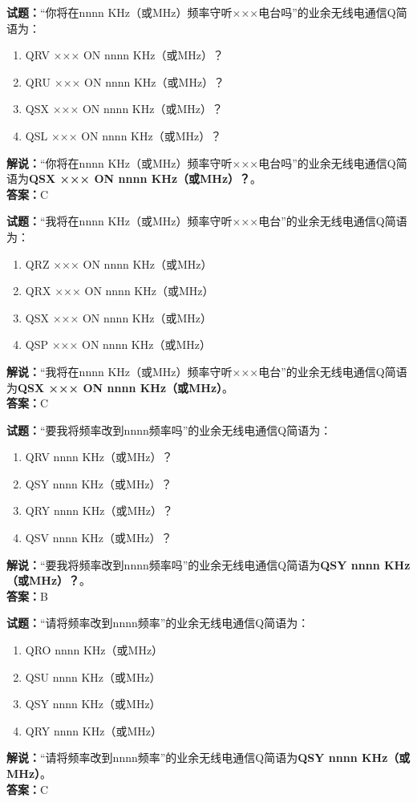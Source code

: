 \documentclass{ctexbook}
\begin{document}
\bigskip


\noindent\textbf{试题：}“你将在nnnn KHz（或MHz）频率守听×××电台吗”的业余无线电通信Q简语为：
\begin{enumerate}[leftmargin=3em]
\item QRV ××× ON nnnn KHz（或MHz）？
\item QRU ××× ON nnnn KHz（或MHz）？
\item QSX ××× ON nnnn KHz（或MHz）？
\item QSL ××× ON nnnn KHz（或MHz）？
\end{enumerate}
\noindent\textbf{解说：}“你将在nnnn KHz（或MHz）频率守听×××电台吗”的业余无线电通信Q简语为\textbf{QSX ××× ON nnnn KHz（或MHz）？}。\\\noindent\textbf{答案：}C



\bigskip


\noindent\textbf{试题：}“我将在nnnn KHz（或MHz）频率守听×××电台”的业余无线电通信Q简语为：
\begin{enumerate}[leftmargin=3em]
\item QRZ ××× ON nnnn KHz（或MHz）
\item QRX ××× ON nnnn KHz（或MHz）
\item QSX ××× ON nnnn KHz（或MHz）
\item QSP ××× ON nnnn KHz（或MHz）
\end{enumerate}
\noindent\textbf{解说：}“我将在nnnn KHz（或MHz）频率守听×××电台”的业余无线电通信Q简语为\textbf{QSX ××× ON nnnn KHz（或MHz）}。\\\noindent\textbf{答案：}C




\bigskip


\noindent\textbf{试题：}“要我将频率改到nnnn频率吗”的业余无线电通信Q简语为：
\begin{enumerate}[leftmargin=3em]
\item QRV nnnn KHz（或MHz）？
\item QSY nnnn KHz（或MHz）？
\item QRY nnnn KHz（或MHz）？
\item QSV nnnn KHz（或MHz）？
\end{enumerate}
\noindent\textbf{解说：}“要我将频率改到nnnn频率吗”的业余无线电通信Q简语为\textbf{QSY nnnn KHz（或MHz）？}。\\\noindent\textbf{答案：}B



\bigskip


\noindent\textbf{试题：}“请将频率改到nnnn频率”的业余无线电通信Q简语为：
\begin{enumerate}[leftmargin=3em]
\item QRO nnnn KHz（或MHz）
\item QSU nnnn KHz（或MHz）
\item QSY nnnn KHz（或MHz）
\item QRY nnnn KHz（或MHz）
\end{enumerate}
\noindent\textbf{解说：}“请将频率改到nnnn频率”的业余无线电通信Q简语为\textbf{QSY nnnn KHz（或MHz）}。\\\noindent\textbf{答案：}C
\end{document}
